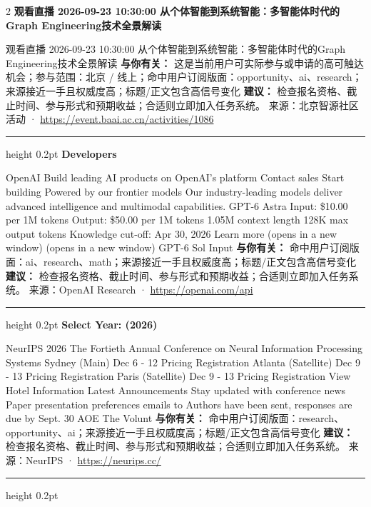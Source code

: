 \documentclass[10.5pt]{ctexart}
\begin{document}
\begin{multicols}{2}
{\large\bfseries 观看直播 2026-09-23 10:30:00 从个体智能到系统智能：多智能体时代的Graph Engineering技术全景解读}\par
观看直播 2026-09-23 10:30:00 从个体智能到系统智能：多智能体时代的Graph Engineering技术全景解读
\textbf{与你有关：} 这是当前用户可实际参与或申请的高可触达机会；参与范围：北京 / 线上；命中用户订阅版面：opportunity、ai、research；来源接近一手且权威度高；标题/正文包含高信号变化
\textbf{建议：} 检查报名资格、截止时间、参与形式和预期收益；合适则立即加入任务系统。
{\footnotesize\color{ormuted} 来源：北京智源社区活动 · \url{https://event.baai.ac.cn/activities/1086}}
\vspace{2mm}
\hrule height 0.2pt
\vspace{2mm}
{\large\bfseries Developers}\par
OpenAI Build leading AI products on OpenAI’s platform Contact sales Start building Powered by our frontier models Our industry-leading models deliver advanced intelligence and multimodal capabilities. GPT-6 Astra Input: \$10.00 per 1M tokens Output: \$50.00 per 1M tokens 1.05M context length 128K max output tokens Knowledge cut-off: Apr 30, 2026 Learn more (opens in a new window) (opens in a new window) GPT-6 Sol Input
\textbf{与你有关：} 命中用户订阅版面：ai、research、math；来源接近一手且权威度高；标题/正文包含高信号变化
\textbf{建议：} 检查报名资格、截止时间、参与形式和预期收益；合适则立即加入任务系统。
{\footnotesize\color{ormuted} 来源：OpenAI Research · \url{https://openai.com/api}}
\vspace{2mm}
\hrule height 0.2pt
\vspace{2mm}
{\large\bfseries Select Year: (2026)}\par
NeurIPS 2026 The Fortieth Annual Conference on Neural Information Processing Systems Sydney (Main) Dec 6 - 12 Pricing Registration Atlanta (Satellite) Dec 9 - 13 Pricing Registration Paris (Satellite) Dec 9 - 13 Pricing Registration View Hotel Information Latest Announcements Stay updated with conference news Paper presentation preferences emails to Authors have been sent, responses are due by Sept. 30 AOE The Volunt
\textbf{与你有关：} 命中用户订阅版面：research、opportunity、ai；来源接近一手且权威度高；标题/正文包含高信号变化
\textbf{建议：} 检查报名资格、截止时间、参与形式和预期收益；合适则立即加入任务系统。
{\footnotesize\color{ormuted} 来源：NeurIPS · \url{https://neurips.cc/}}
\vspace{2mm}
\hrule height 0.2pt
\vspace{2mm}

\end{multicols}
\end{document}
